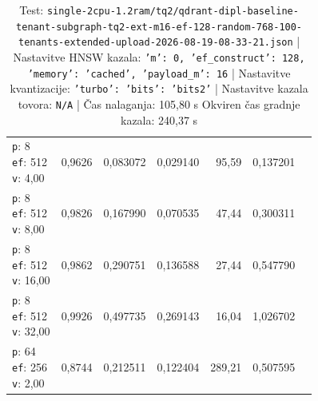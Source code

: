 \begin{table}[htbp]
\begin{tabularx}{\textwidth}{Xrrrrrr}
    \makecell{\texttt{p}: 8\\\texttt{ef}: 512\\\texttt{v}: 4,00} & 0,9626 & 0,083072 & 0,029140 & 95,59 & 0,137201 \\
    \makecell{\texttt{p}: 8\\\texttt{ef}: 512\\\texttt{v}: 8,00} & 0,9826 & 0,167990 & 0,070535 & 47,44 & 0,300311 \\
    \makecell{\texttt{p}: 8\\\texttt{ef}: 512\\\texttt{v}: 16,00} & 0,9862 & 0,290751 & 0,136588 & 27,44 & 0,547790 \\
    \makecell{\texttt{p}: 8\\\texttt{ef}: 512\\\texttt{v}: 32,00} & 0,9926 & 0,497735 & 0,269143 & 16,04 & 1,026702 \\
    \makecell{\texttt{p}: 64\\\texttt{ef}: 256\\\texttt{v}: 2,00} & 0,8744 & 0,212511 & 0,122404 & 289,21 & 0,507595 \\
    \bottomrule
  \end{tabularx}
\caption* {Test: \texttt{single-2cpu-1.2ram/tq2/qdrant-dipl-baseline-tenant-subgraph-tq2-ext-m16-ef-128-random-768-100-tenants-extended-upload-2026-08-19-08-33-21.json} | Nastavitve HNSW kazala: \texttt{{'m': 0, 'ef\_construct': 128, 'memory': 'cached', 'payload\_m': 16}} | Nastavitve kvantizacije: \texttt{{'turbo': {'bits': 'bits2'}}} | Nastavitve kazala tovora: \texttt{N/A} | Čas nalaganja: 105,80 s Okviren čas gradnje kazala: 240,37 s}\end{table}



